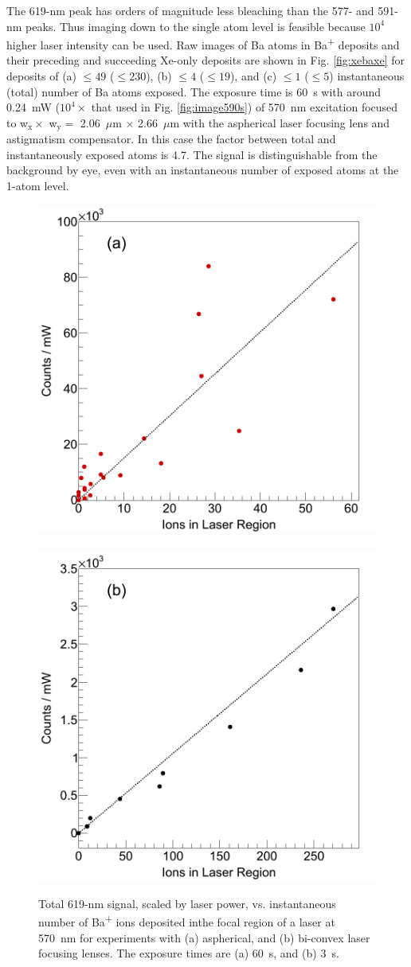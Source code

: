 The 619-nm peak has orders of magnitude less bleaching than the 577- and 591-nm peaks.  Thus imaging down to the single atom level is feasible because $10^4$ higher laser intensity can be used.  Raw images of Ba atoms in Ba\textsuperscript{+} deposits and their preceding and succeeding Xe-only deposits are shown in Fig. \ref{fig:xebaxe} for deposits of (a) $\leq 49$ ($\leq 230$), (b) $\leq 4$ ($\leq 19$), and (c) $\leq 1$ ($\leq 5$) instantaneous (total) number of Ba atoms exposed.  The exposure time is 60~s with around 0.24~mW ($10^4 \times$ that used in Fig. \ref{fig:image590s}) of 570~nm excitation focused to w$_{\text{x}} \times$ w$_{\text{y}} =$ 2.06~$\mu$m $\times$ 2.66~$\mu$m with the aspherical laser focusing lens and astigmatism compensator.  In this case the factor between total and instantaneously exposed atoms is 4.7.  The signal is distinguishable from the background by eye, even with an instantaneous number of exposed atoms at the 1-atom level.


\begin{figure} %
        \centering
                \includegraphics[width=.5\textwidth]{figures/lin_just20150807_lin.png}
                ~
                \includegraphics[width=.5\textwidth]{figures/lin_just20150526_lin.png}
                \caption{Total 619-nm signal, scaled by laser power, vs. instantaneous number of Ba\textsuperscript{+} ions deposited inthe focal region of a laser at 570~nm for experiments with (a) aspherical, and (b) bi-convex laser focusing lenses.  The exposure times are (a) 60~s, and (b) 3~s.}
\label{fig:lin}
\end{figure}

